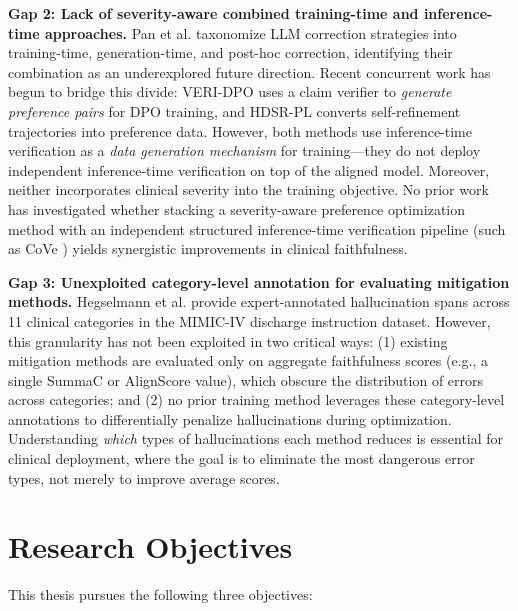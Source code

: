 \documentclass[12pt,a4paper,oneside]{report}
\begin{document}
\textbf{Gap 2: Lack of severity-aware combined training-time and inference-time approaches.}
Pan et al. \cite{pan2024autocorrecting} taxonomize LLM correction strategies into training-time, generation-time, and post-hoc correction, identifying their combination as an underexplored future direction. Recent concurrent work has begun to bridge this divide: VERI-DPO \cite{liu2025veridpo} uses a claim verifier to \textit{generate preference pairs} for DPO training, and HDSR-PL \cite{fang2025hdsrpl} converts self-refinement trajectories into preference data. However, both methods use inference-time verification as a \textit{data generation mechanism} for training---they do not deploy independent inference-time verification on top of the aligned model. Moreover, neither incorporates clinical severity into the training objective. No prior work has investigated whether stacking a severity-aware preference optimization method with an independent structured inference-time verification pipeline (such as CoVe \cite{dhuliawala2023cove}) yields synergistic improvements in clinical faithfulness.

\textbf{Gap 3: Unexploited category-level annotation for evaluating mitigation methods.}
Hegselmann et al. \cite{hegselmann2024datacentric} provide expert-annotated hallucination spans across 11 clinical categories in the MIMIC-IV discharge instruction dataset. However, this granularity has not been exploited in two critical ways: (1) existing mitigation methods are evaluated only on aggregate faithfulness scores (e.g., a single SummaC or AlignScore value), which obscure the distribution of errors across categories; and (2) no prior training method leverages these category-level annotations to differentially penalize hallucinations during optimization. Understanding \textit{which} types of hallucinations each method reduces is essential for clinical deployment, where the goal is to eliminate the most dangerous error types, not merely to improve average scores.

\section{Research Objectives}
\label{sec:objectives}


This thesis pursues the following three objectives:
\end{document}
